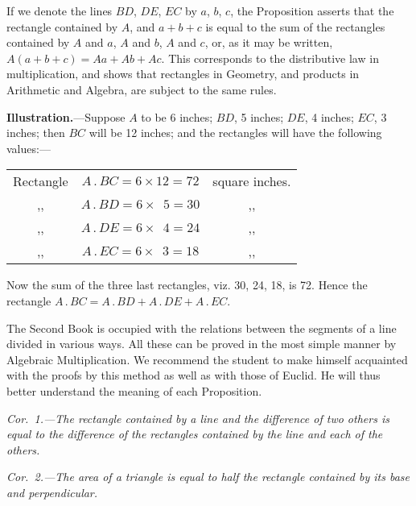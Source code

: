 \documentclass[oneside]{book}
\begin{document}
\begin{footnotesize}
If we denote the lines $BD$, $DE$, $EC$ by $a$, $b$, $c$, the Proposition
asserts that the rectangle contained by $A$, and $a+b+c$ is equal to
the sum of the rectangles contained by $A$ and $a$, $A$ and $b$, $A$ and $c$,
or, as it may be written, $A (a+b+c) = Aa + Ab + Ac$. This corresponds
to the distributive law in multiplication, and shows that
rectangles in Geometry, and products in Arithmetic and Algebra,
are subject to the same rules.\par\medskip

\textbf{Illustration.}---Suppose $A$ to be 6 inches; $BD$, 5 inches;
$DE$, 4 inches; $EC$, 3 inches; then $BC$ will be 12 inches; and
the rectangles will have the following values:---
\begin{center}
\begin{tabular}{c@{\ }c@{\ }c}
Rectangle & $A\,.\,BC = 6\times 12 = 72$ & square inches.  \\
    ,,    & $A\,.\,BD = 6\times \phantom{1}5 = 30$ &  ,,   \\
    ,,    & $A\,.\,DE = 6\times \phantom{1}4 = 24$ &  ,,   \\
    ,,    & $A\,.\,EC = 6\times \phantom{1}3 = 18$ &  ,,
\end{tabular}
\end{center}

Now the sum of the three last rectangles, viz. 30, 24, 18, is 72.
Hence the rectangle $A\,.\,BC = A\,.\,BD + A\,.\,DE + A\,.\,EC$.
\par\end{footnotesize}\medskip

The Second Book is occupied with the relations between
the segments of a line divided in various ways.
All these can be proved in the most simple manner
by Algebraic Multiplication. We recommend the student
to make himself acquainted with the proofs by
this method as well as with those of Euclid. He will
thus better understand the meaning of each Proposition.\par\medskip

\emph{Cor.~\textrm{1}.---The rectangle contained by a line and the
difference of two others is equal to the difference of the
rectangles contained by the line and each of the others.}

\emph{Cor.~\textrm{2}.---The area of a triangle is equal to half the
rectangle contained by its base and perpendicular.}\par\medskip
\end{document}
